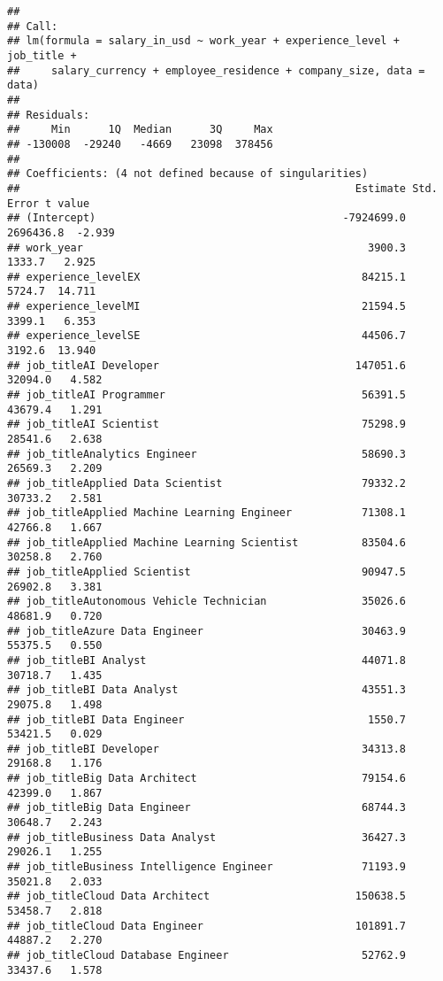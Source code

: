 \documentclass[
]{article}
\begin{document}
\begin{verbatim}
## 
## Call:
## lm(formula = salary_in_usd ~ work_year + experience_level + job_title + 
##     salary_currency + employee_residence + company_size, data = data)
## 
## Residuals:
##     Min      1Q  Median      3Q     Max 
## -130008  -29240   -4669   23098  378456 
## 
## Coefficients: (4 not defined because of singularities)
##                                                     Estimate Std. Error t value
## (Intercept)                                       -7924699.0  2696436.8  -2.939
## work_year                                             3900.3     1333.7   2.925
## experience_levelEX                                   84215.1     5724.7  14.711
## experience_levelMI                                   21594.5     3399.1   6.353
## experience_levelSE                                   44506.7     3192.6  13.940
## job_titleAI Developer                               147051.6    32094.0   4.582
## job_titleAI Programmer                               56391.5    43679.4   1.291
## job_titleAI Scientist                                75298.9    28541.6   2.638
## job_titleAnalytics Engineer                          58690.3    26569.3   2.209
## job_titleApplied Data Scientist                      79332.2    30733.2   2.581
## job_titleApplied Machine Learning Engineer           71308.1    42766.8   1.667
## job_titleApplied Machine Learning Scientist          83504.6    30258.8   2.760
## job_titleApplied Scientist                           90947.5    26902.8   3.381
## job_titleAutonomous Vehicle Technician               35026.6    48681.9   0.720
## job_titleAzure Data Engineer                         30463.9    55375.5   0.550
## job_titleBI Analyst                                  44071.8    30718.7   1.435
## job_titleBI Data Analyst                             43551.3    29075.8   1.498
## job_titleBI Data Engineer                             1550.7    53421.5   0.029
## job_titleBI Developer                                34313.8    29168.8   1.176
## job_titleBig Data Architect                          79154.6    42399.0   1.867
## job_titleBig Data Engineer                           68744.3    30648.7   2.243
## job_titleBusiness Data Analyst                       36427.3    29026.1   1.255
## job_titleBusiness Intelligence Engineer              71193.9    35021.8   2.033
## job_titleCloud Data Architect                       150638.5    53458.7   2.818
## job_titleCloud Data Engineer                        101891.7    44887.2   2.270
## job_titleCloud Database Engineer                     52762.9    33437.6   1.578

\end{verbatim}
\end{document}
